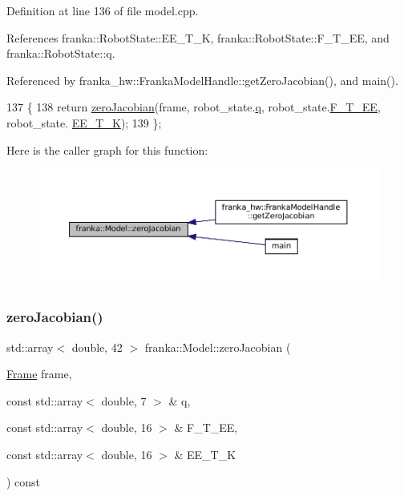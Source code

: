 Definition at line 136 of file model.\+cpp.



References franka\+::\+Robot\+State\+::\+E\+E\+\_\+\+T\+\_\+K, franka\+::\+Robot\+State\+::\+F\+\_\+\+T\+\_\+\+EE, and franka\+::\+Robot\+State\+::q.



Referenced by franka\+\_\+hw\+::\+Franka\+Model\+Handle\+::get\+Zero\+Jacobian(), and main().


\begin{DoxyCode}
137                                                                                       \{
138   \textcolor{keywordflow}{return} \hyperlink{classfranka_1_1Model_a0b0fb1bf5f54be87bfaa023e4d0c5b9f}{zeroJacobian}(frame, robot\_state.\hyperlink{structfranka_1_1RobotState_ade3335d1ac2f6c44741a916d565f7091}{q}, robot\_state.\hyperlink{structfranka_1_1RobotState_a705b85049fef747008b0eba8284c8057}{F\_T\_EE}, robot\_state.
      \hyperlink{structfranka_1_1RobotState_aeb78a3b4b76d4f57b9898cbea3a0f7aa}{EE\_T\_K});
139 \};
\end{DoxyCode}
Here is the caller graph for this function\+:
\nopagebreak
\begin{figure}[H]
\begin{center}
\leavevmode
\includegraphics[width=350pt]{classfranka_1_1Model_a0b0fb1bf5f54be87bfaa023e4d0c5b9f_icgraph}
\end{center}
\end{figure}
\mbox{\label{classfranka_1_1Model_a4b5cfa12760f3db4b919ac0651614386}} 
\subsubsection{\texorpdfstring{zero\+Jacobian()}{zeroJacobian()}\hspace{0.1cm}{\footnotesize\ttfamily [2/2]}}
{\footnotesize\ttfamily std\+::array$<$ double, 42 $>$ franka\+::\+Model\+::zero\+Jacobian (\begin{DoxyParamCaption}\item[{\hyperlink{namespacefranka_a00b729ddce916481d3f0d10febec4f5b}{Frame}}]{frame,  }\item[{const std\+::array$<$ double, 7 $>$ \&}]{q,  }\item[{const std\+::array$<$ double, 16 $>$ \&}]{F\+\_\+\+T\+\_\+\+EE,  }\item[{const std\+::array$<$ double, 16 $>$ \&}]{E\+E\+\_\+\+T\+\_\+K }\end{DoxyParamCaption}) const}

